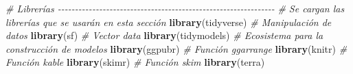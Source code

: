 \documentclass[12pt,a4paper,]{book}
\newenvironment{Shaded}{\begin{snugshade}}{\end{snugshade}}
\newcommand{\CommentTok}[1]{\textcolor[rgb]{0.56,0.35,0.01}{\textit{#1}}}
\newcommand{\FunctionTok}[1]{\textcolor[rgb]{0.13,0.29,0.53}{\textbf{#1}}}
\newcommand{\NormalTok}[1]{#1}
\numberwithin{dummy}{section}
\theoremstyle{ocrenumbox}
\theoremstyle{blacknumex}
\theoremstyle{blacknumbox}
\theoremstyle{ocrenum}
\theoremstyle{ocrenum}
\begin{document}
\begin{Shaded}
\begin{Highlighting}[]
\CommentTok{\# Librerías {-}{-}{-}{-}{-}{-}{-}{-}{-}{-}{-}{-}{-}{-}{-}{-}{-}{-}{-}{-}{-}{-}{-}{-}{-}{-}{-}{-}{-}{-}{-}{-}{-}{-}{-}{-}{-}{-}{-}{-}{-}{-}{-}{-}{-}{-}{-}{-}{-}{-}{-}{-}{-}{-}{-}{-}{-}{-}{-}{-}{-}{-}{-}}
\CommentTok{\# Se cargan las librerías que se usarán en esta sección}
\FunctionTok{library}\NormalTok{(tidyverse) }\CommentTok{\# Manipulación de datos }
\FunctionTok{library}\NormalTok{(sf) }\CommentTok{\# Vector data}
\FunctionTok{library}\NormalTok{(tidymodels) }\CommentTok{\# Ecosistema para la construcción de modelos}
\FunctionTok{library}\NormalTok{(ggpubr) }\CommentTok{\# Función ggarrange}
\FunctionTok{library}\NormalTok{(knitr) }\CommentTok{\# Función kable}
\FunctionTok{library}\NormalTok{(skimr) }\CommentTok{\# Función skim}
\FunctionTok{library}\NormalTok{(terra)}
\end{Highlighting}
\end{Shaded}





%
\end{document}

